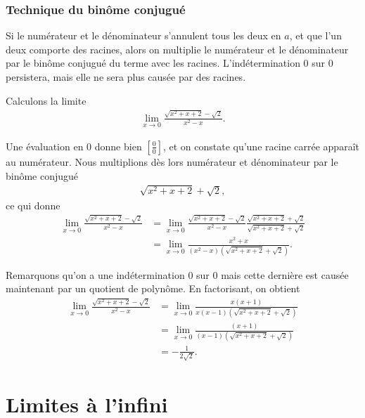 \documentclass[main.tex]{subfiles}
\begin{document}
\subsubsection{Technique du binôme conjugué}

Si le numérateur et le dénominateur s'annulent tous les deux en $a$,
et que l'un deux comporte des racines,
alors on multiplie le numérateur et le dénominateur par le binôme conjugué du terme avec les racines.
L'indétermination $0$ sur $0$ persistera,
mais elle ne sera plus causée par des racines.

\begin{example}

    Calculons la limite
    \begin{align}
        \lim_{x \to 0} \frac {\sqrt{x^2 + x + 2} - \sqrt{2}} {x^2 - x}.
    \end{align}

    Une évaluation en $0$ donne bien $[\frac 0 0]$,
    et on constate qu'une racine carrée apparaît au numérateur.
    Nous multiplions dès lors numérateur et dénominateur par le binôme conjugué
    \begin{align}
        \sqrt {x^2 + x + 2} + \sqrt 2,
    \end{align}
    ce qui donne
    \begin{align}
        \lim_{x \to 0} \frac {\sqrt{x^2 + x + 2} - \sqrt{2}} {x^2 - x}
        &= \lim_{x \to 0} \frac {\sqrt{x^2 + x + 2} - \sqrt{2}} {x^2 - x} \frac {\sqrt {x^2 + x + 2} + \sqrt 2} {\sqrt {x^2 + x + 2} + \sqrt 2}\\
        &= \lim_{x \to 0} \frac {x^2 + x} {(x^2 - x)(\sqrt {x^2 + x + 2} + \sqrt 2)}.
    \end{align}

    Remarquons qu'on a une indétermination $0$ sur $0$
    mais cette dernière est causée maintenant par un quotient de polynôme.
    En factorisant, on obtient
    \begin{align}
        \lim_{x \to 0} \frac {\sqrt{x^2 + x + 2} - \sqrt{2}} {x^2 - x}
        &= \lim_{x \to 0} \frac {x(x + 1)} {x(x - 1)(\sqrt {x^2 + x + 2} + \sqrt 2)}\\
        &= \lim_{x \to 0} \frac {(x + 1)} {(x - 1)(\sqrt {x^2 + x + 2} + \sqrt 2)}\\
        &= -\frac 1 {2 \sqrt 2}.
    \end{align}
\end{example}

\section{Limites à l'infini}
\end{document}
